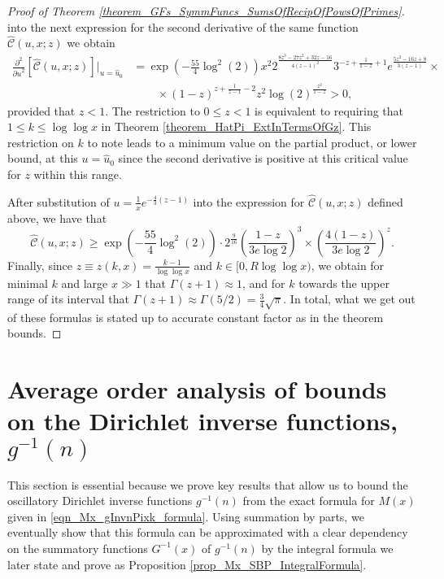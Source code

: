 \documentclass[11pt,reqno,a4letter]{article}
\numberwithin{figure}{section}
\numberwithin{table}{section}
\theoremstyle{plain}
\numberwithin{theorem}{section}
\theoremstyle{definition}
\begin{document}
\begin{proof}[Proof of Theorem \ref{theorem_GFs_SymmFuncs_SumsOfRecipOfPowsOfPrimes}]
into the next expression for the second derivative of the same function 
$\widehat{\mathcal{C}}(u, x; z)$ we obtain 
\begin{align*} 
\frac{\partial^2}{{\partial u}^2}\left[\widehat{\mathcal{C}}(u, x; z)\right] \Biggr\rvert_{u = \hat{u}_0} & = 
     \exp\left(-\frac{55}{4} \log^2(2)\right) x^2 2^{\frac{8 z^3-27 z^2+32 z-16}{4 (z-1)^2}} 
     3^{-z+\frac{1}{1-z}+1} e^{\frac{5 z^2-16 z+8}{3 (z-1)}} \times \\ 
     & \phantom{=\times} \times (1-z)^{z+\frac{1}{z-1}-2} z^2
     \log(2)^{\frac{z^2}{1-z}} > 0, 
\end{align*} 
provided that $z < 1$. 
The restriction to $0 \leq z < 1$ is equivalent to requiring that 
$1 \leq k \leq \log\log x$ in Theorem \ref{theorem_HatPi_ExtInTermsOfGz}. 
This restriction on $k$ to note 
leads to a minimum value on the partial product, or lower bound, at this $u = \hat{u}_0$ 
since the second derivative is positive at this critical value for $z$ within this range. 

After substitution of $u = \frac{1}{x} e^{-\frac{4}{3}(z-1)}$ into the expression for 
$\widehat{\mathcal{C}}(u, x; z)$ defined above, we have that 
\[
\widehat{\mathcal{C}}(u, x; z) \geq \exp\left(-\frac{55}{4} \log^2(2)\right) \cdot 2^{\frac{9}{16}} 
     \left(\frac{1-z}{3e\log 2}\right)^3 \times \left(\frac{4(1-z)}{3e\log 2}\right)^z. 
\]
Finally, since $z \equiv z(k, x) = \frac{k-1}{\log\log x}$ and $k \in [0, R\log\log x)$, we obtain 
for minimal $k$ and large $x \gg 1$ that $\Gamma(z+1) \approx 1$, and for $k$ towards the upper range of 
its interval that $\Gamma(z+1) \approx \Gamma(5/2) = \frac{3}{4} \sqrt{\pi}$. 
In total, what we get out of these formulas is stated up to accurate 
constant factor as in the theorem bounds. 
\end{proof} 

\newpage
\section{Average order analysis of bounds on the Dirichlet inverse functions, $g^{-1}(n)$} 
\label{Section_InvFunc_PreciseExpsAndAsymptotics} 

This section is essential because we prove key results that allow us to 
bound the oscillatory 
Dirichlet inverse functions $g^{-1}(n)$ from the exact formula for $M(x)$ given in 
\eqref{eqn_Mx_gInvnPixk_formula}. 
Using summation by parts, we eventually show that this formula can be approximated with a clear 
dependency on the summatory functions $G^{-1}(x)$ of $g^{-1}(n)$ by the integral formula we later 
state and prove as Proposition \ref{prop_Mx_SBP_IntegralFormula}. 
\end{document}
